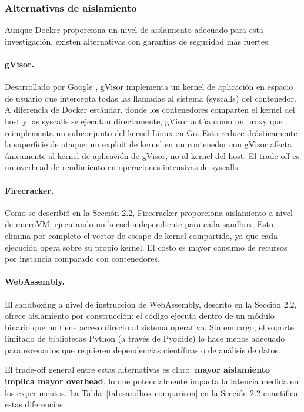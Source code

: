 \subsubsection{Alternativas de aislamiento}

Aunque Docker proporciona un nivel de aislamiento adecuado para esta
investigación, existen alternativas con garantías de seguridad más fuertes:

\paragraph{gVisor.} Desarrollado por Google \citep{gvisor2024}, gVisor
implementa un kernel de aplicación en espacio de usuario que intercepta todas
las llamadas al sistema (syscalls) del contenedor. A diferencia de Docker
estándar, donde los contenedores comparten el kernel del host y las syscalls se
ejecutan directamente, gVisor actúa como un proxy que reimplementa un
subconjunto del kernel Linux en Go. Esto reduce drásticamente la superficie de
ataque: un exploit de kernel en un contenedor con gVisor afecta únicamente al
kernel de aplicación de gVisor, no al kernel del host. El trade-off es un
overhead de rendimiento en operaciones intensivas de syscalls.

\paragraph{Firecracker.} Como se describió en la Sección 2.2, Firecracker
\citep{e2b2024sandbox} proporciona aislamiento a nivel de microVM, ejecutando
un kernel independiente para cada sandbox. Esto elimina por completo el vector
de escape de kernel compartido, ya que cada ejecución opera sobre su propio
kernel. El costo es mayor consumo de recursos por instancia comparado con
contenedores.

\paragraph{WebAssembly.} El sandboxing a nivel de instrucción de WebAssembly,
descrito en la Sección 2.2, ofrece aislamiento por construcción: el código
ejecuta dentro de un módulo binario que no tiene acceso directo al sistema
operativo. Sin embargo, el soporte limitado de bibliotecas Python (a través de
Pyodide) lo hace menos adecuado para escenarios que requieren dependencias
científicas o de análisis de datos.

El trade-off general entre estas alternativas es claro: \textbf{mayor
aislamiento implica mayor overhead}, lo que potencialmente impacta la latencia
medida en los experimentos. La Tabla~\ref{tab:sandbox-comparison} en la Sección
2.2 cuantifica estas diferencias.

